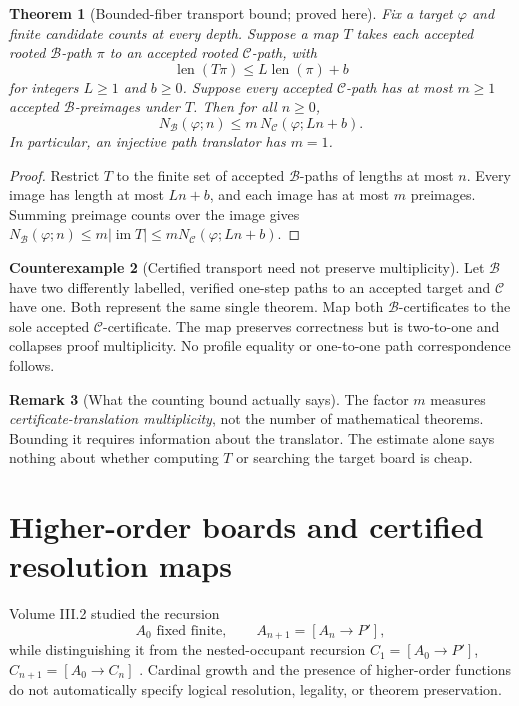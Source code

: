 \documentclass[11pt,letterpaper]{article}
\newtheorem{theorem}{Theorem}[section]
\theoremstyle{definition}
\newtheorem{counterexample}[theorem]{Counterexample}
\newtheorem{remark}[theorem]{Remark}
\newcommand{\B}{\mathcal B}
\begin{document}
\begin{theorem}[Bounded-fiber transport bound; proved here]\label{thm:fiber}
Fix a target $\varphi$ and finite candidate counts at every depth. Suppose a map $T$ takes each accepted rooted $\B$-path $\pi$ to an accepted rooted $\mathcal C$-path, with
\[
\operatorname{len}(T\pi)\le L\operatorname{len}(\pi)+b
\]
for integers $L\ge1$ and $b\ge0$. Suppose every accepted $\mathcal C$-path has at most $m\ge1$ accepted $\B$-preimages under $T$. Then for all $n\ge0$,
\[
\boxed{N_\B(\varphi;n)\le m\,N_{\mathcal C}(\varphi;Ln+b).}
\]
In particular, an injective path translator has $m=1$.
\end{theorem}
\begin{proof}
Restrict $T$ to the finite set of accepted $\B$-paths of lengths at most $n$. Every image has length at most $Ln+b$, and each image has at most $m$ preimages. Summing preimage counts over the image gives $N_\B(\varphi;n)\le m|\operatorname{im}T|\le mN_{\mathcal C}(\varphi;Ln+b)$.
\end{proof}
\begin{counterexample}[Certified transport need not preserve multiplicity]\label{ce:collapse}
Let $\B$ have two differently labelled, verified one-step paths to an accepted target and $\mathcal C$ have one. Both represent the same single theorem. Map both $\B$-certificates to the sole accepted $\mathcal C$-certificate. The map preserves correctness but is two-to-one and collapses proof multiplicity. No profile equality or one-to-one path correspondence follows.
\end{counterexample}
\begin{remark}[What the counting bound actually says]
The factor $m$ measures \emph{certificate-translation multiplicity}, not the number of mathematical theorems. Bounding it requires information about the translator. The estimate alone says nothing about whether computing $T$ or searching the target board is cheap.
\end{remark}

\section{Higher-order boards and certified resolution maps}
Volume III.2 studied the recursion
\[
A_0\text{ fixed finite},\qquad A_{n+1}=[A_n\to P'],
\]
while distinguishing it from the nested-occupant recursion $C_1=[A_0\to P']$, $C_{n+1}=[A_0\to C_n]$ \cite{vol32}. Cardinal growth and the presence of higher-order functions do not automatically specify logical resolution, legality, or theorem preservation.
\end{document}

